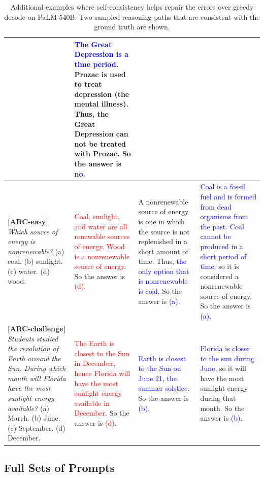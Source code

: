 \begin{table}[h]
\begin{tabular}{p{3cm} | p{3.3cm} | p{3cm} | p{3.4cm} }
         & \textcolor{blue}{The Great Depression is a time period}. Prozac is used to treat depression (the mental illness). Thus, the Great Depression can not be treated with Prozac. So the answer is \textcolor{blue}{no}.\\
         \midrule
         \textbf{[ARC-easy]} \textit{Which source of energy is nonrenewable?} (a) coal. (b) sunlight. (c) water. (d) wood.
         & \textcolor{red}{Coal, sunlight, and water are all renewable sources of energy. Wood is a nonrenewable source of energy}. So the answer is \textcolor{red}{(d)}.
         & A nonrenewable source of energy is one in which the source is not replenished in a short amount of time. Thus, \textcolor{blue}{the only option that is nonrenewable is coal}. So the answer is \textcolor{blue}{(a)}.
         & \textcolor{blue}{Coal is a fossil fuel and is formed from dead organisms from the past}. \textcolor{blue}{Coal cannot be produced in a short period of time}, so it is considered a nonrenewable source of energy. So the answer is \textcolor{blue}{(a)}.\\
         \midrule
         \textbf{[ARC-challenge]}  \textit{Students studied the revolution of Earth around the Sun. During which month will Florida have the most sunlight energy available? 
} (a) March. (b) June. (c) September. (d) December.
        & \textcolor{red}{The Earth is closest to the Sun in December, hence Florida will have the most sunlight energy available in December.} So the answer is \textcolor{red}{(d)}.
        & \textcolor{blue}{Earth is closest to the Sun on June 21, the summer solstice}. So the answer is \textcolor{blue}{(b)}.
        & \textcolor{blue}{Florida is closer to the sun during June}, so it will have the most sunlight energy during that month. So the answer is \textcolor{blue}{(b)}.\\
         \bottomrule
    \end{tabular}
    \caption{Additional examples where self-consistency helps repair the errors over greedy decode on PaLM-540B. Two sampled reasoning paths that are consistent with the ground truth are shown.}
    \label{tab:example_additional_palm}
\end{table}

\subsection{Full Sets of Prompts}
\label{sec:appendix-prompt}

